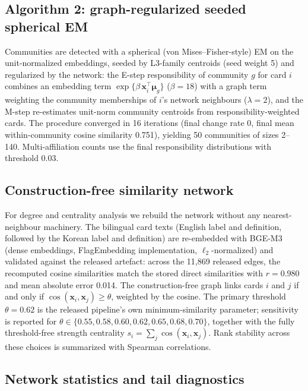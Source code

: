 \documentclass[fleqn,10pt]{wlscirep}
\begin{document}
\subsection*{Algorithm 2: graph-regularized seeded spherical EM}

Communities are detected with a spherical (von Mises--Fisher-style) EM on the
unit-normalized embeddings\cite{banerjee2005}, seeded by L3-family centroids
(seed weight 5) and regularized by the network: the E-step responsibility of
community $g$ for card $i$ combines an embedding term
$\exp\{\beta\,\mathbf{x}_i^{\top}\boldsymbol{\mu}_g\}$ ($\beta=18$) with a
graph term weighting the community memberships of $i$'s network neighbours
($\lambda=2$), and the M-step re-estimates unit-norm community centroids from
responsibility-weighted cards. The procedure converged in 16 iterations
(final change rate 0, final mean within-community cosine similarity 0.751),
yielding 50 communities of sizes 2--140. Multi-affiliation counts use the
final responsibility distributions with threshold 0.03.

\subsection*{Construction-free similarity network}

For degree and centrality analysis we rebuild the network without any
nearest-neighbour machinery. The bilingual card texts (English label and
definition, followed by the Korean label and definition) are re-embedded
with BGE-M3 (dense embeddings, FlagEmbedding implementation,
$\ell_2$-normalized) and validated against the released artefact: across
the 11,869 released edges, the recomputed cosine similarities match the
stored direct similarities with $r=0.980$ and mean absolute error 0.014.
The construction-free graph links cards $i$ and $j$ if and only if
$\cos(\mathbf{x}_i,\mathbf{x}_j) \geq \theta$, weighted by the cosine. The
primary threshold $\theta=0.62$ is the released pipeline's own
minimum-similarity parameter; sensitivity is reported for $\theta \in
\{0.55, 0.58, 0.60, 0.62, 0.65, 0.68, 0.70\}$, together with the fully
threshold-free strength centrality $s_i=\sum_j \cos(\mathbf{x}_i,
\mathbf{x}_j)$. Rank stability across these choices is summarized with
Spearman correlations.

\subsection*{Network statistics and tail diagnostics}
\end{document}
